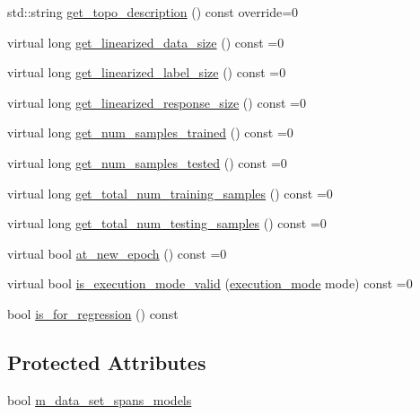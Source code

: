 \begin{DoxyCompactItemize}
\item 
std\+::string \hyperlink{classlbann_1_1io__layer_a955ab7100591d07d0758e8f95c6e50be}{get\+\_\+topo\+\_\+description} () const override=0
\item 
virtual long \hyperlink{classlbann_1_1io__layer_ab061ec74d131699c7fd59b992bbe7036}{get\+\_\+linearized\+\_\+data\+\_\+size} () const =0
\item 
virtual long \hyperlink{classlbann_1_1io__layer_a72a9a1411892b6f03de8b8f9923d77a6}{get\+\_\+linearized\+\_\+label\+\_\+size} () const =0
\item 
virtual long \hyperlink{classlbann_1_1io__layer_acbc2723e37e911eef6a38caa02c9e708}{get\+\_\+linearized\+\_\+response\+\_\+size} () const =0
\item 
virtual long \hyperlink{classlbann_1_1io__layer_ad25bf7559a27065c39d0c1d2f849347f}{get\+\_\+num\+\_\+samples\+\_\+trained} () const =0
\item 
virtual long \hyperlink{classlbann_1_1io__layer_a2b2c9d3c1efce23840ef0c88ec566616}{get\+\_\+num\+\_\+samples\+\_\+tested} () const =0
\item 
virtual long \hyperlink{classlbann_1_1io__layer_a744fe02208657194120714387b49cb28}{get\+\_\+total\+\_\+num\+\_\+training\+\_\+samples} () const =0
\item 
virtual long \hyperlink{classlbann_1_1io__layer_a8c1575ad108ffbdf2a553a44509211e6}{get\+\_\+total\+\_\+num\+\_\+testing\+\_\+samples} () const =0
\item 
virtual bool \hyperlink{classlbann_1_1io__layer_a0cedc21bf38c1e3d60a93b41981a1626}{at\+\_\+new\+\_\+epoch} () const =0
\item 
virtual bool \hyperlink{classlbann_1_1io__layer_a37e2f77a99ee44106ac7d9fd3a275dcc}{is\+\_\+execution\+\_\+mode\+\_\+valid} (\hyperlink{base_8hpp_a2781a159088df64ed7d47cc91c4dc0a8}{execution\+\_\+mode} mode) const =0
\item 
bool \hyperlink{classlbann_1_1io__layer_a61f2e00334c820235795154492876476}{is\+\_\+for\+\_\+regression} () const
\end{DoxyCompactItemize}
\subsection*{Protected Attributes}
\begin{DoxyCompactItemize}
\item 
bool \hyperlink{classlbann_1_1io__layer_a05c9d6e6cb12e8eb345ac6f5cb95644b}{m\+\_\+data\+\_\+set\+\_\+spans\+\_\+models}
\end{DoxyCompactItemize}
